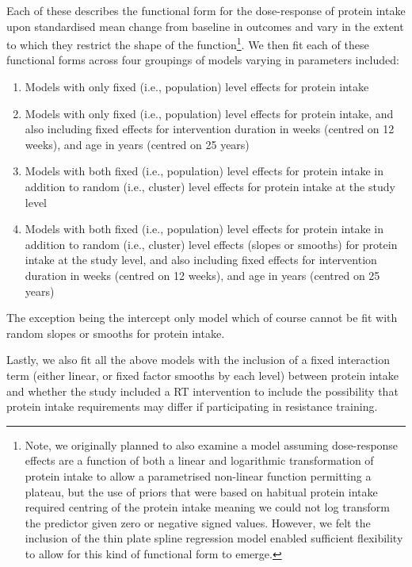 \documentclass[
]{article}
\providecommand{\tightlist}{%
  \setlength{\itemsep}{0pt}\setlength{\parskip}{0pt}}
\begin{document}
Each of these describes the functional form for the dose-response of
protein intake upon standardised mean change from baseline in outcomes
and vary in the extent to which they restrict the shape of the
function\footnote{Note, we originally planned to also examine a model
  assuming dose-response effects are a function of both a linear and
  logarithmic transformation of protein intake to allow a parametrised
  non-linear function permitting a plateau, but the use of priors that
  were based on habitual protein intake required centring of the protein
  intake meaning we could not log transform the predictor given zero or
  negative signed values. However, we felt the inclusion of the thin
  plate spline regression model enabled sufficient flexibility to allow
  for this kind of functional form to emerge.}. We then fit each of
these functional forms across four groupings of models varying in
parameters included:

\begin{enumerate}
\def\labelenumi{\arabic{enumi}.}
\tightlist
\item
  Models with only fixed (i.e., population) level effects for protein
  intake
\item
  Models with only fixed (i.e., population) level effects for protein
  intake, and also including fixed effects for intervention duration in
  weeks (centred on 12 weeks), and age in years (centred on 25 years)
\item
  Models with both fixed (i.e., population) level effects for protein
  intake in addition to random (i.e., cluster) level effects for protein
  intake at the study level
\item
  Models with both fixed (i.e., population) level effects for protein
  intake in addition to random (i.e., cluster) level effects (slopes or
  smooths) for protein intake at the study level, and also including
  fixed effects for intervention duration in weeks (centred on 12
  weeks), and age in years (centred on 25 years)
\end{enumerate}

The exception being the intercept only model which of course cannot be
fit with random slopes or smooths for protein intake.

Lastly, we also fit all the above models with the inclusion of a fixed
interaction term (either linear, or fixed factor smooths by each level)
between protein intake and whether the study included a RT intervention
to include the possibility that protein intake requirements may differ
if participating in resistance training.
\end{document}
